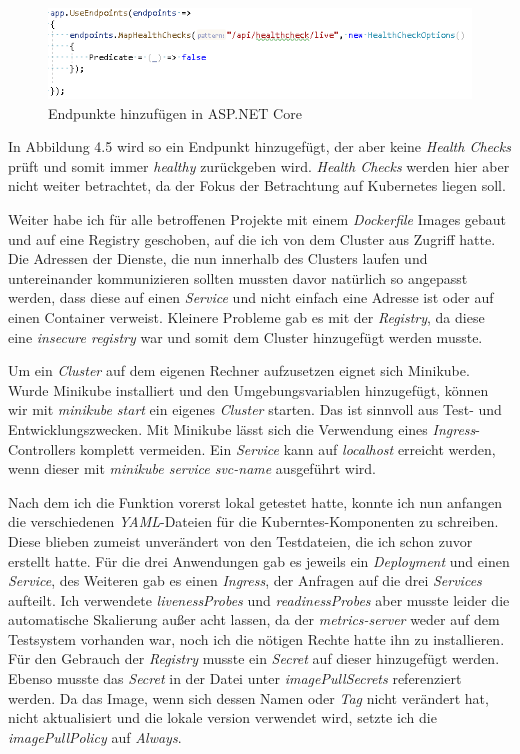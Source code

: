 \documentclass[12pt,a4paper]{scrartcl}
\begin{document}
\begin{figure}[h!]
	\centering
	\includegraphics[scale=1]{CsEndpoint.png}
	\caption[Screenshot]{Endpunkte hinzufügen in ASP.NET Core}
\end{figure}

In Abbildung 4.5 wird so ein Endpunkt hinzugefügt, der aber keine \emph{Health Checks} prüft und somit immer \emph{healthy} zurückgeben wird. \emph{Health Checks} werden hier aber nicht weiter betrachtet, da der Fokus der Betrachtung auf Kubernetes liegen soll.

Weiter habe ich für alle betroffenen Projekte mit einem \emph{Dockerfile} Images gebaut und auf eine Registry geschoben, auf die ich von dem Cluster aus Zugriff hatte. Die Adressen der Dienste, die nun innerhalb des Clusters laufen und untereinander kommunizieren sollten mussten davor natürlich so angepasst werden, dass diese auf einen \emph{Service} und nicht einfach eine Adresse ist oder auf einen Container verweist. Kleinere Probleme gab es mit der \emph{Registry}, da diese eine \emph{insecure registry} war und somit dem Cluster hinzugefügt werden musste.

Um ein \emph{Cluster} auf dem eigenen Rechner aufzusetzen eignet sich Minikube. Wurde Minikube installiert und den Umgebungsvariablen hinzugefügt, können wir mit \emph{minikube start} ein eigenes \emph{Cluster} starten. Das ist sinnvoll aus Test- und Entwicklungszwecken. Mit Minikube lässt sich die Verwendung eines \emph{Ingress}-Controllers komplett vermeiden. Ein \emph{Service} kann auf \emph{localhost} erreicht werden, wenn dieser mit \emph{minikube service svc-name} ausgeführt wird. 

Nach dem ich die Funktion vorerst lokal getestet hatte, konnte ich nun anfangen die verschiedenen \emph{YAML}-Dateien für die Kuberntes-Komponenten zu schreiben. Diese blieben zumeist unverändert von den Testdateien, die ich schon zuvor erstellt hatte. Für die drei Anwendungen gab es jeweils ein \emph{Deployment} und einen \emph{Service}, des Weiteren gab es einen \emph{Ingress}, der Anfragen auf die drei \emph{Services} aufteilt. Ich verwendete \emph{livenessProbes} und \emph{readinessProbes} aber musste leider die automatische Skalierung außer acht lassen, da der \emph{metrics-server} weder auf dem Testsystem vorhanden war, noch ich die nötigen Rechte hatte ihn zu installieren. Für den Gebrauch der \emph{Registry} musste ein \emph{Secret} auf dieser hinzugefügt werden. Ebenso musste das \emph{Secret} in der Datei unter \emph{imagePullSecrets} referenziert werden. Da das Image, wenn sich dessen Namen oder \emph{Tag} nicht verändert hat, nicht aktualisiert und die lokale version verwendet wird, setzte ich die \emph{imagePullPolicy} auf \emph{Always}.
\end{document}
